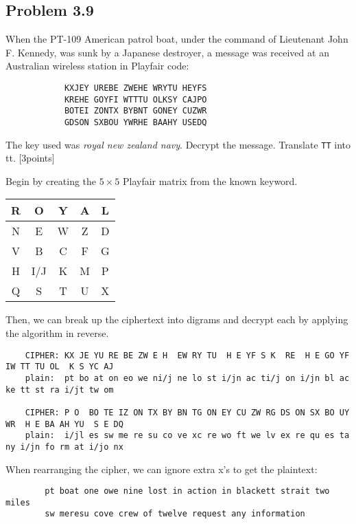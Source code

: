 \documentclass[../hw_sols.tex]{subfiles}
\begin{document}
\newpage



\subsection*{Problem 3.9}
When the PT-109 American patrol boat, under the command of Lieutenant John F. Kennedy, was sunk by a Japanese destroyer, a message was received at an Australian wireless station in Playfair code:
\begin{verbatim}
            KXJEY UREBE ZWEHE WRYTU HEYFS
            KREHE GOYFI WTTTU OLKSY CAJPO
            BOTEI ZONTX BYBNT GONEY CUZWR
            GDSON SXBOU YWRHE BAAHY USEDQ
\end{verbatim}

\noindent The key used was \textit{royal new zealand navy}. Decrypt the message. Translate \verb|TT| into tt. [3points]

\begin{solution}
Begin by creating the $5 \times 5$ Playfair matrix from the known keyword.
\begin{center}
	\begin{tabular}{ | c | c | c | c | c | }
		\hline \rowcolor{cyan!40}
		R & O & Y & A & L \\
		\hline \rowcolor{cyan!40}
		N & E & W & Z & D \\
		\hline
		\cellcolor{cyan!40} V & B & C & F & G \\
		\hline
		H & I/J & K & M & P \\
		\hline
		Q &   S & T & U & X \\
		\hline
	\end{tabular}
\end{center}

\noindent Then, we can break up the ciphertext into digrams and decrypt each by applying the algorithm in reverse.
	\begin{verbatim}
	CIPHER: KX JE YU RE BE ZW E H  EW RY TU  H E YF S K  RE  H E GO YF IW TT TU OL  K S YC AJ
	plain:  pt bo at on eo we ni/j ne lo st i/jn ac ti/j on i/jn bl ac ke tt st ra i/jt tw om

	CIPHER: P O  BO TE IZ ON TX BY BN TG ON EY CU ZW RG DS ON SX BO UY WR  H E BA AH YU  S E DQ
	plain:  i/jl es sw me re su co ve xc re wo ft we lv ex re qu es ta ny i/jn fo rm at i/jo nx
	\end{verbatim}

\noindent When rearranging the cipher, we can ignore extra x's to get the plaintext:
	\begin{verbatim}
	    pt boat one owe nine lost in action in blackett strait two miles
	    sw meresu cove crew of twelve request any information
	\end{verbatim}

\end{solution}
\end{document}
